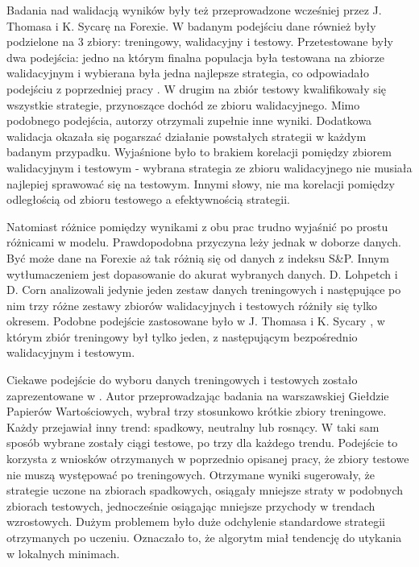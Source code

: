\documentclass[twoside]{iisthesis}
\begin{document}
Badania nad walidacją wyników były też przeprowadzone wcześniej przez J. Thomasa i K. Sycarę \cite{Thomas1999TheIO} na Forexie.  W badanym podejściu dane również były podzielone na 3 zbiory: treningowy, walidacyjny i testowy. Przetestowane były dwa podejścia: jedno na którym finalna populacja była testowana na zbiorze walidacyjnym i wybierana była jedna najlepsze strategia, co odpowiadało podejściu z poprzedniej pracy \cite{5393324}. W drugim na zbiór testowy kwalifikowały się wszystkie strategie, przynoszące dochód ze zbioru walidacyjnego. Mimo podobnego podejścia, autorzy otrzymali zupełnie inne wyniki. Dodatkowa walidacja okazała się pogarszać działanie powstałych strategii w każdym badanym przypadku. Wyjaśnione było to brakiem korelacji pomiędzy zbiorem walidacyjnym i testowym - wybrana strategia ze zbioru walidacyjnego nie musiała najlepiej sprawować się na testowym. Innymi słowy, nie ma korelacji pomiędzy odległością od zbioru testowego a efektywnością strategii.

Natomiast różnice pomiędzy wynikami z obu prac trudno wyjaśnić po prostu różnicami w modelu. Prawdopodobna przyczyna leży jednak w doborze danych. Być może dane na Forexie aż tak różnią się od danych z indeksu S\&P. Innym wytłumaczeniem jest dopasowanie do akurat wybranych danych. D. Lohpetch i D. Corn \cite{5393324} analizowali jedynie jeden zestaw danych treningowych i następujące po nim trzy różne zestawy zbiorów walidacyjnych i testowych różniły się tylko okresem. Podobne podejście zastosowane było w J. Thomasa i K. Sycary \cite{Thomas1999TheIO}, w którym zbiór treningowy był tylko jeden, z następującym bezpośrednio walidacyjnym i testowym.

Ciekawe podejście do wyboru danych treningowych i testowych zostało zaprezentowane w \cite{GPW}. Autor przeprowadzając badania na warszawskiej Giełdzie Papierów Wartościowych, wybrał trzy stosunkowo krótkie zbiory treningowe. Każdy przejawiał inny trend: spadkowy, neutralny lub rosnący. W taki sam sposób wybrane zostały ciągi testowe, po trzy dla każdego trendu. Podejście to korzysta z wniosków otrzymanych w poprzednio opisanej pracy,  że zbiory testowe nie muszą występować po treningowych. Otrzymane wyniki sugerowały, że strategie uczone na zbiorach spadkowych, osiągały mniejsze straty w podobnych zbiorach testowych, jednocześnie osiągając mniejsze przychody w trendach wzrostowych. Dużym problemem było duże odchylenie standardowe strategii otrzymanych po uczeniu. Oznaczało to, że algorytm miał tendencję do utykania w lokalnych minimach.
\end{document}
